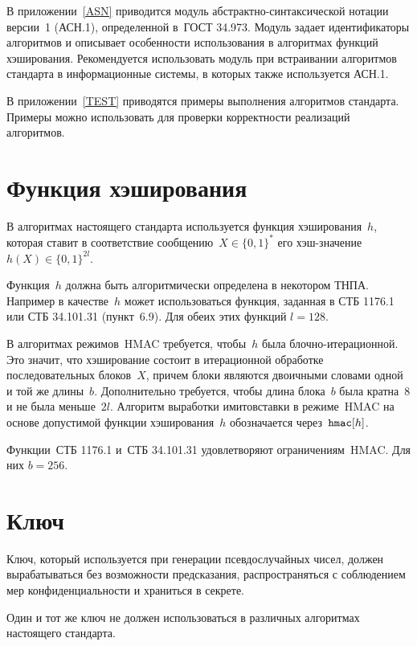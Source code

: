 В приложении~\ref{ASN} приводится модуль
абстрактно-синтаксической нотации версии~1 (АСН.1),
определенной в~ГОСТ 34.973.
Модуль задает идентификаторы алгоритмов и 
описывает особенности использования в алгоритмах 
функций хэширования.
%
Рекомендуется использовать модуль 
при встраивании алгоритмов стандарта в информационные системы, 
в которых также используется АСН.1.

В приложении~\ref{TEST} приводятся примеры выполнения алгоритмов стандарта.
Примеры можно использовать для проверки корректности 
реализаций алгоритмов.

\section{Функция хэширования}\label{COMMON.Hash}

В алгоритмах настоящего стандарта используется функция хэширования~$h$,
которая ставит в соответствие сообщению~$X\in\{0,1\}^*$ 
его хэш-значение~$h(X)\in\{0,1\}^{2l}$.
%

Функция~$h$ должна быть алгоритмически определена в некотором ТНПА. 
Например в качестве~$h$ может использоваться функция, 
заданная в СТБ 1176.1 или СТБ 34.101.31 (пункт~6.9).
Для обеих этих функций $l=128$.

В алгоритмах режимов~HMAC требуется, чтобы~$h$ была 
блочно-итерационной. Это значит, что хэширование состоит в итерационной 
обработке последовательных блоков~$X$,
причем блоки являются двоичными словами одной и той же длины~$b$.
%
Дополнительно требуется, чтобы длина блока~$b$ была кратна~$8$ и не была 
меньше~$2l$.
%
Алгоритм выработки имитовставки в режиме~HMAC на основе допустимой функции 
хэширования~$h$ обозначается через~$\texttt{hmac}[h]$.

Функции~СТБ 1176.1 и~СТБ 34.101.31 удовлетворяют ограничениям~HMAC. 
Для них $b=256$.

\section{Ключ}\label{COMMON.Key}

Ключ, который используется при генерации псевдослучайных чисел,
должен вырабатываться без возможности предсказания, 
распространяться с соблюдением мер конфиденциальности и храниться в секрете.

Один и тот же ключ не должен использоваться в различных алгоритмах
настоящего стандарта.

